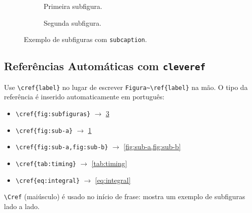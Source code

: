 \begin{figure}[htbp]
  \centering
  \begin{subfigure}[b]{0.45\textwidth}
    \centering
    \caption{Primeira subfigura.}
    \label{fig:sub-a}
  \end{subfigure}
  \hfill
  \begin{subfigure}[b]{0.45\textwidth}
    \centering
    \caption{Segunda subfigura.}
    \label{fig:sub-b}
  \end{subfigure}
  \caption{Exemplo de subfiguras com \texttt{subcaption}.}
  \label{fig:subfiguras}
\end{figure}

\FloatBarrier
\subsection{Referências Automáticas com \texttt{cleveref}}

Use \verb|\cref{label}| no lugar de escrever \verb|Figura~\ref{label}| na mão.
O tipo da referência é inserido automaticamente em português:

\begin{itemize}
  \item \verb|\cref{fig:subfiguras}|          $\to$ \cref{fig:subfiguras}
  \item \verb|\cref{fig:sub-a}|               $\to$ \cref{fig:sub-a}
  \item \verb|\cref{fig:sub-a,fig:sub-b}|     $\to$ \cref{fig:sub-a,fig:sub-b}
  \item \verb|\cref{tab:timing}|              $\to$ \cref{tab:timing}
  \item \verb|\cref{eq:integral}|             $\to$ \cref{eq:integral}
\end{itemize}

\verb|\Cref| (maiúsculo) é usado no início de frase:
 mostra um exemplo de subfiguras lado a lado.
